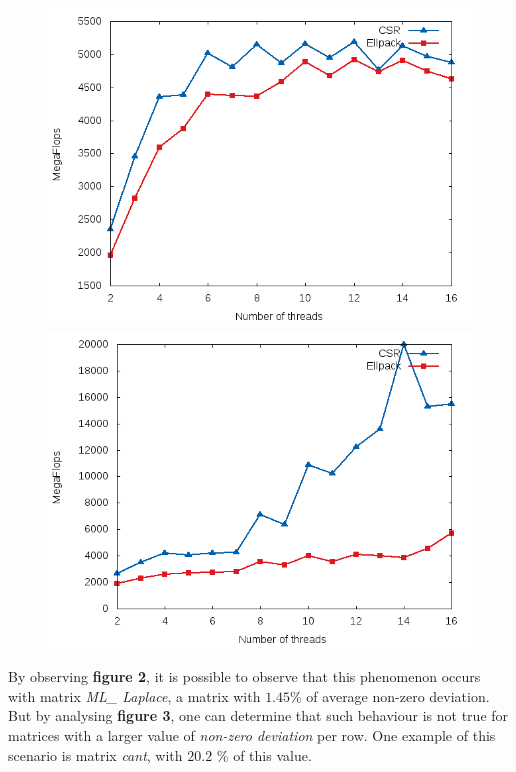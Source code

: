 \documentclass[12pt]{article}
\begin{document}
\begin{figure}[!htb]
\centering
\begin{minipage}{.5\textwidth}
  \centering
  \includegraphics[width=.8\linewidth]{OMP_ML_Laplace.png}
\end{minipage}%
\begin{minipage}{.5\textwidth}
  \centering
  \includegraphics[width=.8\linewidth]{OMP_cant.png}
\end{minipage}
\end{figure}

By observing \textbf{figure 2}, it is possible to observe that this phenomenon occurs with matrix \textit{ML\_ Laplace}, a matrix with $1.45 $\% of average non-zero deviation. But by analysing \textbf{figure 3}, one can determine that such behaviour is not true for matrices with a larger value of \textit{non-zero deviation} per row. One example of this scenario is matrix \textit{cant}, with $20.2$ \% of this value.
\end{document}
